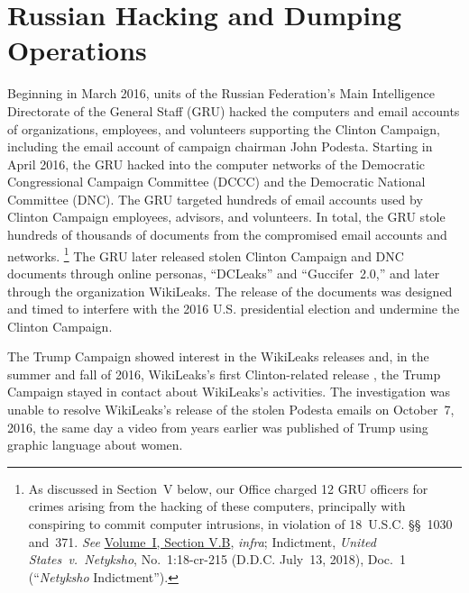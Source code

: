 \section{Russian Hacking and Dumping Operations}

Beginning in March 2016, units of the Russian Federation's Main Intelligence Directorate of the General Staff (GRU) hacked the computers and email accounts of organizations, employees, and volunteers supporting the Clinton Campaign, including the email account of campaign chairman John Podesta.
Starting in April 2016, the GRU hacked into the computer networks of the Democratic Congressional Campaign Committee (DCCC) and the Democratic National Committee (DNC).
The GRU targeted hundreds of email accounts used by Clinton Campaign employees, advisors, and volunteers.
In total, the GRU stole hundreds of thousands of documents from the compromised email accounts and networks.%
\footnote{As discussed in Section~V below, our Office charged 12 GRU officers for crimes arising from the hacking of these computers, principally with conspiring to commit computer intrusions, in violation of
18~U.S.C. \S\S~1030 and~371.
\textit{See} \hyperlink{subsection.1.5.2}{Volume~I, Section V.B}, \textit{infra};
Indictment, \textit{United States~v.\ Netyksho}, No.~1:18-cr-215 (D.D.C. July~13, 2018), Doc.~1 (``\textit{Netyksho} Indictment'').}
The GRU later released stolen Clinton Campaign and DNC documents through online personas, ``DCLeaks'' and ``Guccifer~2.0,'' and later through the organization WikiLeaks.
The release of the documents was designed and timed to interfere with the 2016 U.S. presidential election and undermine the Clinton Campaign.

The Trump Campaign showed interest in the WikiLeaks releases and, in the summer and fall of 2016, 
WikiLeaks's first Clinton-related release , the Trump Campaign stayed in contact  about WikiLeaks's activities.
The investigation was unable to resolve 
WikiLeaks's release of the stolen Podesta emails on October~7, 2016, the same day a video from years earlier was published of Trump using graphic language about women.

